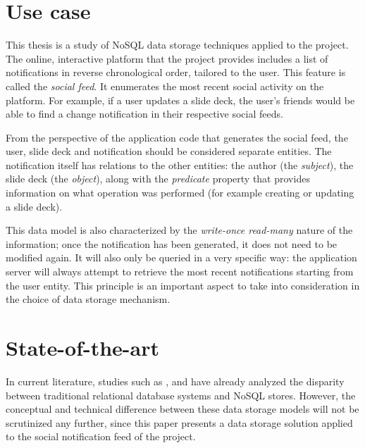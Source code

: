 
\section{Use case}
\label{sec:use-case}

This thesis is a study of NoSQL data storage techniques applied to the \textcite{OpenWebslides} project. The online, interactive platform that the project provides includes a list of notifications in reverse chronological order, tailored to the user. This feature is called the \textit{social feed}. It enumerates the most recent social activity on the platform. For example, if a user updates a slide deck, the user's friends would be able to find a change notification in their respective social feeds.

From the perspective of the application code that generates the social feed, the user, slide deck and notification should be considered separate entities. The notification itself has relations to the other entities: the author (the \textit{subject}), the slide deck (the \textit{object}), along with the \textit{predicate} property that provides information on what operation was performed (for example creating or updating a slide deck).

This data model is also characterized by the \textit{write-once read-many} nature of the information; once the notification has been generated, it does not need to be modified again. It will also only be queried in a very specific way: the application server will always attempt to retrieve the most recent notifications starting from the user entity.
This principle is an important aspect to take into consideration in the choice of data storage mechanism.


\section{State-of-the-art}
\label{sec:state-of-the-art}

In current literature, studies such as \textcite{Moniruzzaman2013}, \textcite{NayakPoriyaPoojary2003} and \textcite{HammesMederoMitchell2014} have already analyzed the disparity between traditional relational database systems and NoSQL stores.
However, the conceptual and technical difference between these data storage models will not be scrutinized any further, since this paper presents a data storage solution applied to the social notification feed of the \textcite{OpenWebslides} project.


